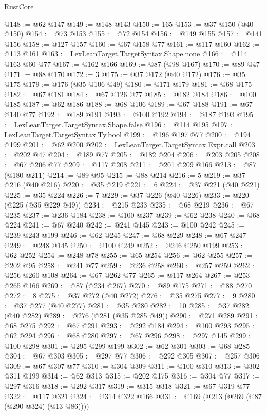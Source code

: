 \begin{lexlean}{RustCore}
\begin{coremodule}
@148 := @62 @147
@149 := @148 @143
@150 := 165
@153 := @37 @150 (@40 @150)
@154 := @73 @153
@155 := @72 @154
@156 := @149 @155
@157 := @141 @156
@158 := @127 @157
@160 := @67 @158 @77
@161 := @117 @160
@162 := @113 @161
@163 := LexLeanTarget.TargetSyntax.Shape.none
@166 := @114 @163 @60 @77
@167 := @162 @166
@169 := @87 (@98 @167)
@170 := @89 @47
@171 := @88 @170
@172 := 3
@175 := @37 @172 (@40 @172)
@176 := @35 @175
@179 := @176 (@35 @106 @49)
@180 := @171 @179
@181 := @68 @175
@182 := @67 @181
@184 := @67 @126 @77
@185 := @182 @184
@186 := @100 @185
@187 := @62 @186
@188 := @68 @106
@189 := @67 @188
@191 := @67 @140 @77
@192 := @189 @191
@193 := @100 @192
@194 := @187 @193
@195 := LexLeanTarget.TargetSyntax.Shape.false
@196 := @114 @195
@197 := LexLeanTarget.TargetSyntax.Ty.bool
@199 := @196 @197 @77
@200 := @194 @199
@201 := @62 @200
@202 := LexLeanTarget.TargetSyntax.Expr.call
@203 := @202 @47
@204 := @189 @77
@205 := @182 @204
@206 := @203 @205
@208 := @67 @206 @77
@209 := @117 @208
@211 := @201 @209 @166
@213 := @87 (@180 @211)
@214 := @89 @95
@215 := @88 @214
@216 := 5
@219 := @37 @216 (@40 @216)
@220 := @35 @219
@221 := 6
@224 := @37 @221 (@40 @221)
@225 := @35 @224
@226 := 7
@229 := @37 @226 (@40 @226)
@233 := @220 (@225 (@35 @229 @49))
@234 := @215 @233
@235 := @68 @219
@236 := @67 @235
@237 := @236 @184
@238 := @100 @237
@239 := @62 @238
@240 := @68 @224
@241 := @67 @240
@242 := @241 @145
@243 := @100 @242
@245 := @239 @243 @199
@246 := @62 @245
@247 := @68 @229
@248 := @67 @247
@249 := @248 @145
@250 := @100 @249
@252 := @246 @250 @199
@253 := @62 @252
@254 := @248 @78
@255 := @65 @254
@256 := @62 @255
@257 := @202 @95
@258 := @241 @77
@259 := @236 @258
@260 := @257 @259
@262 := @256 @260 @108
@264 := @67 @262 @77
@265 := @117 @264
@267 := @253 @265 @166
@269 := @87 (@234 @267)
@270 := @89 @175
@271 := @88 @270
@272 := 8
@275 := @37 @272 (@40 @272)
@276 := @35 @275
@277 := 9
@280 := @37 @277 (@40 @277)
@281 := @35 @280
@282 := 10
@285 := @37 @282 (@40 @282)
@289 := @276 (@281 (@35 @285 @49))
@290 := @271 @289
@291 := @68 @275
@292 := @67 @291
@293 := @292 @184
@294 := @100 @293
@295 := @62 @294
@296 := @68 @280
@297 := @67 @296
@298 := @297 @145
@299 := @100 @298
@301 := @295 @299 @199
@302 := @62 @301
@303 := @68 @285
@304 := @67 @303
@305 := @297 @77
@306 := @292 @305
@307 := @257 @306
@309 := @67 @307 @77
@310 := @304 @309
@311 := @100 @310
@313 := @302 @311 @199
@314 := @62 @313
@315 := @202 @175
@316 := @304 @77
@317 := @297 @316
@318 := @292 @317
@319 := @315 @318
@321 := @67 @319 @77
@322 := @117 @321
@324 := @314 @322 @166
@331 := @169 (@213 (@269 (@87 (@290 @324) (@13 @86))))

\end{coremodule}
\end{lexlean}
